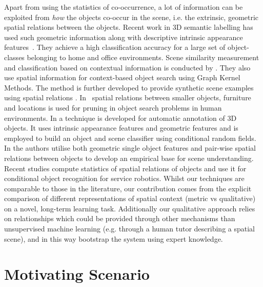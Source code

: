 \documentclass[letterpaper, 10 pt, conference]{ieeeconf}  %
\begin{document}
Apart from using the statistics of co-occurrence, a lot of information can be exploited from \textit{how} the objects co-occur in the scene, i.e. the extrinsic, geometric spatial relations between the objects. Recent work in 3D semantic labelling has used such geometric information along with descriptive intrinsic appearance features~\cite{Koppula:NIPS2011}. They achieve a high classification accuracy for a large set of object-classes belonging to home and office environments. Scene similarity measurement and classification based on contextual information is conducted by \cite{Fisher:ACMT2011}. They also use spatial information for context-based object search using Graph Kernel Methods. The method is further developed to provide synthetic scene examples using spatial relations \cite{Fisher:ACMT2012}. In~\cite{Aydemir:ICRA2011} spatial relations between smaller objects, furniture and locations is used for pruning in object search problems in human environments. In \cite{Lin:ICCV2013} a technique is developed for automatic annotation of 3D objects. It uses intrinsic appearance features and geometric features and is employed to build an object and scene classifier using conditional random fields. In \cite{kasper:2011} the authors utilise both geometric single object features and pair-wise spatial relations between objects to develop an empirical base for scene understanding. Recent studies \cite{Southey:2007,kasper:2011} compute statistics of spatial relations of objects and use it for conditional object recognition for service robotics. Whilst our techniques are comparable to those in the literature, our contribution comes from the explicit comparison of different representations of spatial context (metric vs qualitative) on a novel, long-term learning task. Additionally our qualitative approach relies on relationships which could be provided through other mechanisms than unsupervised machine learning (e.g. through a human tutor describing a spatial scene), and in this way bootstrap the system using expert knowledge.

\section{Motivating Scenario}
\label{sec:Motivating Scenario}
\end{document}
